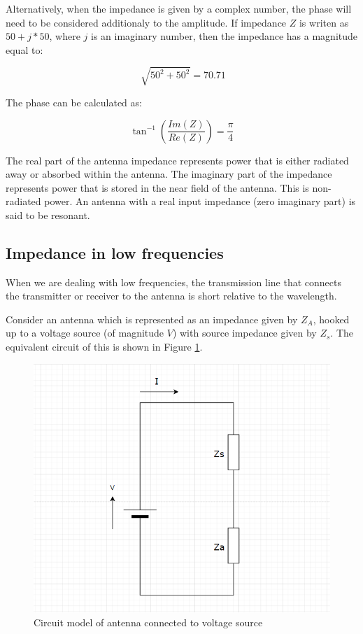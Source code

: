 \documentclass[a4paper,12pt]{report}
\begin{document}
Alternatively, when the impedance is given by a complex number,
the phase will need to be considered additionaly to the amplitude.
If impedance $Z$ is writen as $50 + j*50$, where $j$ is an imaginary number,
then the impedance has a magnitude equal to:

\begin{equation}
  \sqrt[]{50^2 + 50 ^2} = 70.71
\end{equation}

The phase can be calculated as:

\begin{equation}
  \tan^{-1}(\frac{Im(Z)}{Re(Z)}) = \frac{\pi}{4}
\end{equation}

The real part of the antenna impedance represents power that is either radiated away or absorbed within the antenna.
The imaginary part of the impedance represents power
that is stored in the near field of the antenna.
This is non-radiated power.
An antenna with a real input impedance (zero imaginary part)
is said to be resonant.

\subsection{Impedance in low frequencies}

When we are dealing with low frequencies,
the transmission line that connects the transmitter or receiver
to the antenna is short relative to the wavelength.

Consider an antenna which is represented as an impedance given by $Z_A$,
hooked up to a voltage source (of magnitude $V$) with source impedance given by $Z_s$.
The equivalent circuit of this is shown in
Figure \ref{fig:low_freq_circuit_diagram}.

\begin{figure}
  \begin{center}
    \includegraphics[clip, keepaspectratio, width=0.5\linewidth]{img/low_freq_circuit_diagram.png}
    \caption{Circuit model of antenna connected to voltage source}
    \label{fig:low_freq_circuit_diagram}
  \end{center}
\end{figure}
\end{document}
